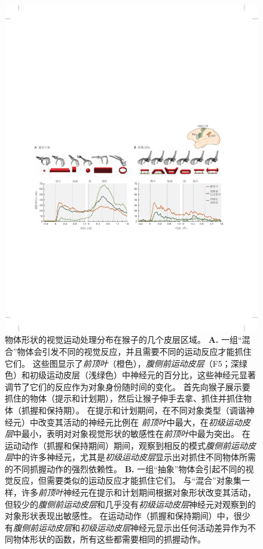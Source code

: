 \begin{figure}[htbp]
	\centering
	\includegraphics[width=1.0\linewidth]{chap34/fig_34_15}
	\caption{物体形状的视觉运动处理分布在猴子的几个皮层区域\cite{schaffelhofer2016object}。
		\textbf{A.} 一组“混合”物体会引发不同的视觉反应，并且需要不同的运动反应才能抓住它们。
		这些图显示了\textit{前顶叶}（橙色），\textit{腹侧前运动皮层}（F5；深绿色）和初级运动皮层（浅绿色）中神经元的百分比，这些神经元显著调节了它们的反应作为对象身份随时间的变化。
		首先向猴子展示要抓住的物体（提示和计划期），然后让猴子伸手去拿、抓住并抓住物体（抓握和保持期）。
		在提示和计划期间，在不同对象类型（调谐神经元）中改变其活动的神经元比例在 \textit{前顶叶}中最大，在\textit{初级运动皮层}中最小，表明对对象视觉形状的敏感性在\textit{前顶叶}中最为突出。
		在运动动作（抓握和保持期间）期间，观察到相反的模式\textit{腹侧前运动皮层}中的许多神经元，尤其是\textit{初级运动皮层}显示出对抓住不同物体所需的不同抓握动作的强烈依赖性。
		\textbf{B.} 一组“抽象”物体会引起不同的视觉反应，但需要类似的运动反应才能抓住它们。
		与“混合”对象集一样，许多\textit{前顶叶}神经元在提示和计划期间根据对象形状改变其活动，但较少的\textit{腹侧前运动皮层}和几乎没有\textit{初级运动皮层}神经元对观察到的对象形状表现出敏感性。
		在运动动作（抓握和保持期间）中，很少有\textit{腹侧前运动皮层}和\textit{初级运动皮层}神经元显示出任何活动差异作为不同物体形状的函数，所有这些都需要相同的抓握动作。}
	\label{fig:34_15}
\end{figure}



